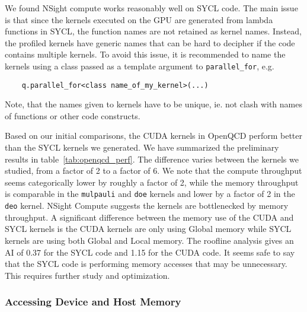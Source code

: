 \documentclass[../main]{subfiles}
\begin{document}
We found NSight compute works reasonably well on SYCL code.
The main issue is that since the kernels executed on the GPU are generated from lambda functions in SYCL, the function names are not retained as kernel names.
Instead, the profiled kernels have generic names that can be hard to decipher if the code contains multiple kernels.
To avoid this issue, it is recommended to name the kernels using a class passed as a template argument to \verb #parallel_for#, e.g.
\begin{verbatim}
    q.parallel_for<class name_of_my_kernel>(...)
\end{verbatim}
Note, that the names given to kernels have to be unique, ie. not clash with names of functions or other code constructs.

Based on our initial comparisons, the CUDA kernels in OpenQCD perform better than the SYCL kernels we generated.
We have summarized the preliminary results in table~\ref{tab:openqcd_perf}.
The difference varies between the kernels we studied, from a factor of 2 to a factor of 6.
We note that the compute throughput seems categorically lower by roughly a factor of 2, while the memory throughput is comparable in the \verb #mulpauli# and \verb #doe# kernels and lower by a factor of 2 in the \verb #deo# kernel.
NSight Compute suggests the kernels are bottlenecked by memory throughput.
A significant difference between the memory use of the CUDA and SYCL kernels is the CUDA kernels are only using Global memory while SYCL kernels are using both Global and Local memory.
The roofline analysis gives an AI of 0.37 for the SYCL code and 1.15 for the CUDA code.
It seems safe to say that the SYCL code is performing memory accesses that may be unnecessary.
This requires further study and optimization.

\subsubsection{Accessing Device and Host Memory}\label{sec:openqcd_memoryaccess}

\end{document}

